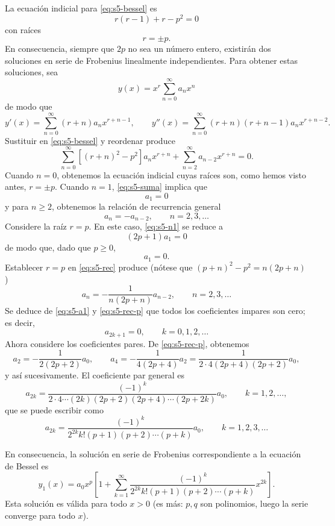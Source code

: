 La ecuación indicial para \eqref{eq:s5-bessel} es
\[ r(r - 1) + r - p^2 = 0 \]
con raíces
\[ r = \pm p. \]
En consecuencia, siempre que $2p$ no sea un número entero, existirán dos soluciones en serie de Frobenius linealmente independientes. Para obtener estas soluciones, sea
\begin{equation}
y(x) = x^r \sum_{n=0}^{\infty} a_n x^n
\label{eq:s5-ansatz}
\end{equation}
de modo que
\[ y'(x) = \sum_{n=0}^{\infty} (r + n)a_n x^{r+n-1}, \qquad y''(x) = \sum_{n=0}^{\infty} (r + n)(r + n - 1)a_n x^{r+n-2}. \]
Sustituir en \eqref{eq:s5-bessel} y reordenar produce
\begin{equation}
\sum_{n=0}^{\infty} [(r + n)^2 - p^2]a_n x^{r+n} + \sum_{n=2}^{\infty} a_{n-2} x^{r+n} = 0.
\label{eq:s5-suma}
\end{equation}
Cuando $n = 0$, obtenemos la ecuación indicial cuyas raíces son, como hemos visto antes, $r = \pm p$. Cuando $n = 1$, \eqref{eq:s5-suma} implica que
\begin{equation}
[(r + 1)^2 - p^2]a_1 = 0
\label{eq:s5-n1}
\end{equation}
y para $n \ge 2$, obtenemos la relación de recurrencia general
\begin{equation}
[(r + n)^2 - p^2]a_n = -a_{n-2}, \qquad n = 2, 3, \dots
\label{eq:s5-rec}
\end{equation}
Considere la raíz $r = p$. En este caso, \eqref{eq:s5-n1} se reduce a
\[ (2p + 1)a_1 = 0 \]
de modo que, dado que $p \ge 0$,
\begin{equation}
a_1 = 0.
\label{eq:s5-a1}
\end{equation}
Establecer $r = p$ en \eqref{eq:s5-rec} produce (nótese que $(p+n)^2-p^2=n(2p+n)$)
\begin{equation}
a_n = -\frac{1}{n(2p + n)}a_{n-2}, \qquad n = 2, 3, \dots
\label{eq:s5-rec-p}
\end{equation}
Se deduce de \eqref{eq:s5-a1} y \eqref{eq:s5-rec-p} que todos los coeficientes impares son cero; es decir,
\begin{equation}
a_{2k+1} = 0, \qquad k = 0, 1, 2, \dots
\label{eq:s5-impares}
\end{equation}
Ahora considere los coeficientes pares. De \eqref{eq:s5-rec-p}, obtenemos
\[ a_2 = -\frac{1}{2(2p + 2)}a_0, \qquad a_4 = -\frac{1}{4(2p + 4)}a_2 = \frac{1}{2 \cdot 4(2p + 4)(2p + 2)}a_0, \]
y así sucesivamente. El coeficiente par general es
\[ a_{2k} = \frac{(-1)^k}{2 \cdot 4 \cdots (2k)(2p + 2)(2p + 4) \cdots (2p + 2k)}a_0, \qquad k = 1, 2, \dots, \]
que se puede escribir como
\[ a_{2k} = \frac{(-1)^k}{2^{2k}k!(p + 1)(p + 2) \cdots (p + k)}a_0, \qquad k = 1, 2, 3, \dots \]
\begin{remark}
En consecuencia, la solución en serie de Frobenius correspondiente a la ecuación de Bessel es
\begin{equation}
y_1(x) = a_0 x^p \left[ 1 + \sum_{k=1}^{\infty} \frac{(-1)^k}{2^{2k}k!(p + 1)(p + 2) \cdots (p + k)}x^{2k} \right].
\label{eq:s5-y1}
\end{equation}
Esta solución es válida para todo $x > 0$ (es más: $p,q$ son polinomios, luego la serie converge para todo $x$).
\end{remark}
 
